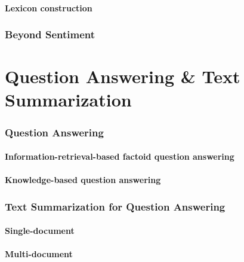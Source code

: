\documentclass[10pt,twocolumn]{article}
\begin{document}
\subsection{Lexicon construction}

\section{Beyond Sentiment}

\pagebreak
\part{Question Answering \& Text Summarization}

\section{Question Answering}

\subsection{Information-retrieval-based factoid question answering}

\subsection{Knowledge-based question answering}

\section{Text Summarization for Question Answering}

\subsection{Single-document}

\subsection{Multi-document}
\end{document}
